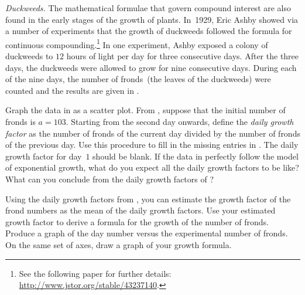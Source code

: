 \documentclass[a4paper,oneside,12pt]{article}
\begin{document}
\begin{problem}
\begin{table}[!htbp]
\centering

\caption{%
  The experimental number of fronds in a colony of duckweeds, counted
  each day for nine consecutive days.  Before the first day, the
  colony had been exposed to $12$ hours of light per day for three
  consecutive days.  The missing entries should contain the daily
  growth factors.
}
\label{tab:duckweed_frond12_missing}
\end{table}

\item\label{prob:duckweeds}
  \emph{Duckweeds.}
  The mathematical formulae that govern compound interest are also
  found in the early stages of the growth of plants.  In~1929, Eric
  Ashby showed via a number of experiments that the growth of
  duckweeds followed the formula for continuous compounding.\footnote{
    See the following paper for further details:
    \url{http://www.jstor.org/stable/43237140}.
  }
  In one experiment, Ashby exposed a colony of duckweeds to $12$ hours
  of light per day for three consecutive days.  After the three days,
  the duckweeds were allowed to grow for nine consecutive days.
  During each of the nine days, the number of fronds~(the leaves of
  the duckweeds) were counted and the results are given in
  .
  \begin{packedenum}
  \item\label{subprob:duckweeds_growth_factor}
    Graph the data in  as a
    scatter plot.  From , suppose
    that the initial number of fronds is $a = 103$.  Starting from the
    second day onwards, define the \emph{daily growth factor} as the
    number of fronds of the current day divided by the number of
    fronds of the previous day.  Use this procedure to fill in the
    missing entries in .  The
    daily growth factor for day~$1$ should be blank.  If the data in
     perfectly follow the model of
    exponential growth, what do you expect all the daily growth
    factors to be like?  What can you conclude from the daily growth
    factors of ?

  \item\label{subprob:duckweeds_growth_factor_estimate}
    Using the daily growth factors
    from , you can estimate the
    growth factor of the frond numbers as the mean of the daily growth
    factors.  Use your estimated growth factor to derive a formula for
    the growth of the number of fronds.  Produce a graph of the day
    number versus the experimental number of fronds.  On the same set
    of axes, draw a graph of your growth formula.


\end{packedenum}
\end{problem}
\end{document}
